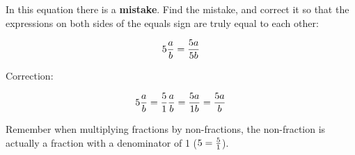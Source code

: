 

In this equation there is a {\bf mistake}.  Find the mistake, and correct it so that the expressions on both sides of the equals sign are truly equal to each other:

$$5{a \over b} = {5a \over 5b}$$







Correction:

$$5{a \over b} = {5 \over 1} {a \over b} = {5a \over 1b} = {5a \over b}$$







Remember when multiplying fractions by non-fractions, the non-fraction is actually a fraction with a denominator of 1 ($5 = {5 \over 1}$).




